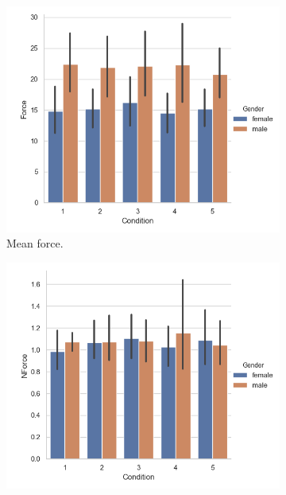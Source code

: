 \begin{figure}[H]
\hspace{-10mm}
     \begin{subfigure}[b]{0.3\textwidth}
         \centering
     \includegraphics[scale=0.4]{Files/Plots/force_mean_by_condition__gen.png}
         \caption{Mean force.}
     \label{fig:forceMeanCondGen}
     \end{subfigure}
     \hspace{7mm}
     \begin{subfigure}[b]{0.3\textwidth}
         \centering
     \includegraphics[scale=0.4]{Files/Plots/forceNforce_mean_by_condition_gen.png}

\end{subfigure}
\end{figure}
